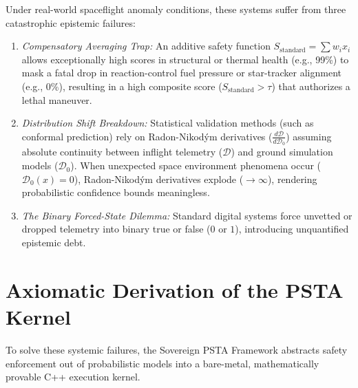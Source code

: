 \documentclass[journal]{IEEEtran}
\begin{document}
Under real-world spaceflight anomaly conditions, these systems suffer from three catastrophic epistemic failures:
\begin{enumerate}
    \item \emph{Compensatory Averaging Trap:} An additive safety function $S_{\text{standard}} = \sum w_i x_i$ allows exceptionally high scores in structural or thermal health (e.g., 99\%) to mask a fatal drop in reaction-control fuel pressure or star-tracker alignment (e.g., 0\%), resulting in a high composite score ($S_{\text{standard}} > \tau$) that authorizes a lethal maneuver.
    \item \emph{Distribution Shift Breakdown:} Statistical validation methods (such as conformal prediction) rely on Radon-Nikod\'ym derivatives ($\frac{d\mathcal{D}}{d\mathcal{D}_0}$) assuming absolute continuity between inflight telemetry ($\mathcal{D}$) and ground simulation models ($\mathcal{D}_0$). When unexpected space environment phenomena occur ($\mathcal{D}_0(x) = 0$), Radon-Nikod\'ym derivatives explode ($\to \infty$), rendering probabilistic confidence bounds meaningless.
    \item \emph{The Binary Forced-State Dilemma:} Standard digital systems force unvetted or dropped telemetry into binary true or false ($0$ or $1$), introducing unquantified epistemic debt.
\end{enumerate}

\section{Axiomatic Derivation of the PSTA Kernel}

To solve these systemic failures, the Sovereign PSTA Framework abstracts safety enforcement out of probabilistic models into a bare-metal, mathematically provable C++ execution kernel.
\end{document}
